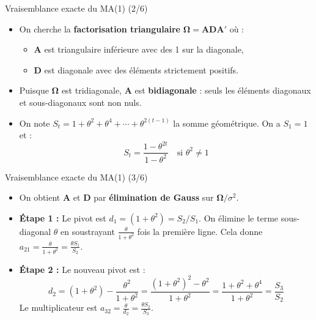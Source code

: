 \documentclass[11pt,aspectratio=169]{beamer}
\begin{document}
\begin{frame}{Vraisemblance exacte du MA(1) (2/6)}

\begin{itemize}

\item On cherche la \textbf{factorisation triangulaire} $\bm{\Omega} = \mathbf{A}\mathbf{D}\mathbf{A}'$ où :
  \begin{itemize}
    \item $\mathbf{A}$ est triangulaire inférieure avec des 1 sur la diagonale,
    \item $\mathbf{D}$ est diagonale avec des éléments strictement positifs.
  \end{itemize}

\item Puisque $\bm{\Omega}$ est tridiagonale, $\mathbf{A}$ est \textbf{bidiagonale} : seuls les éléments diagonaux et sous-diagonaux sont non nuls.\newline

\item On note $S_t = 1 + \theta^2 + \theta^4 + \cdots + \theta^{2(t-1)}$ la somme géométrique. On a $S_1 = 1$ et :
  \[
  S_t = \frac{1 - \theta^{2t}}{1 - \theta^2} \quad \text{si } \theta^2 \neq 1
  \]

\end{itemize}

\end{frame}

\begin{frame}{Vraisemblance exacte du MA(1) (3/6)}

\begin{itemize}

\item On obtient $\mathbf{A}$ et $\mathbf{D}$ par \textbf{élimination de Gauss} sur $\bm{\Omega}/\sigma^2$.\newline

\item \textbf{Étape 1 :} Le pivot est $d_1 = (1 + \theta^2) = S_2/S_1$. On élimine le terme sous-diagonal $\theta$ en soustrayant $\frac{\theta}{1+\theta^2}$ fois la première ligne. Cela donne $a_{21} = \frac{\theta}{1+\theta^2} = \frac{\theta S_1}{S_2}$.\newline

\item \textbf{Étape 2 :} Le nouveau pivot est :
  \[
  d_2 = (1+\theta^2) - \frac{\theta^2}{1+\theta^2} = \frac{(1+\theta^2)^2 - \theta^2}{1+\theta^2} = \frac{1+\theta^2+\theta^4}{1+\theta^2} = \frac{S_3}{S_2}
  \]
  Le multiplicateur est $a_{32} = \frac{\theta}{d_2} = \frac{\theta S_2}{S_3}$.

\end{itemize}

\end{frame}
\end{document}
